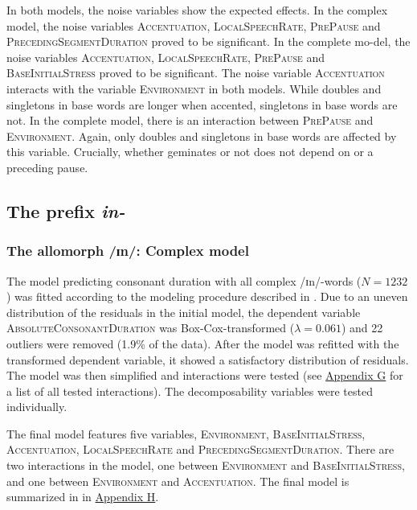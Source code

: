  In both models, the noise variables show the expected effects. In the complex model, the noise variables \textsc{Accentuation}, \textsc{LocalSpeechRate}, \textsc{PrePause} and \textsc{PrecedingSegmentDuration} proved to be significant. In the complete mo-del, the noise variables \textsc{Accentuation}, \textsc{LocalSpeechRate}, \textsc{PrePause} and \textsc{BaseInitialStress} proved to be significant.
 The noise variable \textsc{Accentuation} interacts with the variable \textsc{Environment} in both models. While doubles and singletons in base words are longer when accented, singletons in base words are not. In the complete model, there is an interaction between \textsc{PrePause} and \textsc{Environment}. Again, only doubles and singletons in base words are affected by this variable. Crucially,  whether  geminates or not does not depend on  or a preceding pause. 


\subsection{The prefix \textit{in-}} \label{in experiment}

\subsubsection{The allomorph /ɪn/: Complex model}

The model predicting consonant duration with all complex /ɪn/-words ($N=1232$) was fitted according to the modeling procedure described in . Due to an uneven distribution of the residuals in the initial model, the dependent variable \textsc{AbsoluteConsonantDuration} was Box-Cox-transformed ($\lambda = 0.061$) and 22 outliers were removed (1.9\% of the data).
After the model was refitted with the transformed dependent variable, it showed a satisfactory distribution of residuals.  The model was then simplified and interactions were tested (see \hyperref[Appendix G Summaries of tested interactions in experimental study]{Appendix G} for a list of all tested interactions).
The decomposability variables were tested individually.

The final model features five variables, \textsc{Environment}, \textsc{BaseInitialStress}, \textsc{Accentuation}, \textsc{LocalSpeechRate} and \textsc{PrecedingSegmentDuration}. 
There are two interactions in the model, one between \textsc{Environment} and \textsc{BaseInitialStress}, and one between \textsc{Environment} and \textsc{Accentuation}. The final model is summarized in  in \hyperref[Appendix H: Model Summaries Experiment]{Appendix H}.


